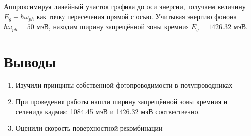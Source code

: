 \documentclass[a4paper, 12pt]{article}
\begin{document}
    Аппроксимируя линейный участок графика до оси энергии, получаем величину $E_g+\hbar\omega_{ph}$ как точку пересечения прямой с осью. Учитывая энергию фонона $\hbar\omega_{ph}=50$ мэВ, находим ширину запрещённой зоны кремния $E_g=1426.32$ мэВ.
    \section{Выводы}
    \begin{enumerate}
        \item Изучили принципы собственной фотопроводимости в полупроводниках
        \item При проведении работы нашли ширину запрещённой зоны кремния и селенида кадмия: 1084.45 мэВ и 1426.32 мэВ соотвественно.
        \item Оценили скорость поверхностной рекомбинации
    \end{enumerate}
    
\end{document}
